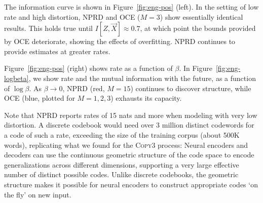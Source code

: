 \documentclass[11pt,letterpaper]{article}
\newif \ifcomment
\newcommand\rljf[1]{\ifcomment{{\color{blue}(#1)}}\else{}\fi}
\begin{document}
The information curve is shown in Figure~\ref{fig:eng-pos} (left).
In the setting of low rate and high distortion, NPRD and OCE ($M=3$) show essentially identical results.
This holds true until $I[Z, \overrightarrow{X}] \approx 0.7$, at which point the bounds provided by OCE deteriorate, showing the effects of overfitting.
NPRD continues to provide estimates at greater rates.

Figure~\ref{fig:eng-pos} (right) shows rate as a function of $\beta$.
In Figure~\ref{fig:eng-logbeta}, we show rate and the mutual information with the future, as a function of $\log \beta$.
As $\beta \rightarrow 0$, NPRD (red, $M=15$) continues to discover structure, while OCE (blue, plotted for $M=1,2,3$) exhausts its capacity. \rljf{Remind us what $\beta$ is}

Note that NPRD reports rates of 15 nats and more when modeling with very low distortion.
A discrete codebook would need over 3 million distinct codewords for a code of such a rate, exceeding the size of the training corpus (about 500K words), replicating what we found for the \textsc{Copy3} process:
Neural encoders and decoders can use the continuous geometric structure of the code space to encode generalizations across different dimensions, supporting a very large effective number of distinct possible codes.
Unlike discrete codebooks, the geometric structure makes it possible for neural encoders to construct appropriate codes `on the fly' on new input.



\end{document}
